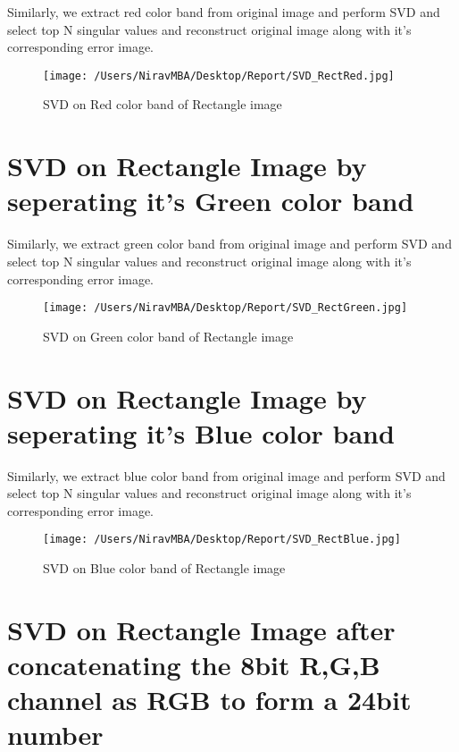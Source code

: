 \documentclass[12pt]{report}
\begin{document}
Similarly, we extract red color band from original image and perform SVD and select top N singular values and reconstruct original image along with it's corresponding error image.\\


\begin{figure}[H]
	
	\texttt{[image: /Users/NiravMBA/Desktop/Report/SVD\_RectRed.jpg]}
	\caption{SVD on Red color band of Rectangle image}
\end{figure}
\cleardoublepage

\section{SVD on Rectangle Image by seperating it's Green color band}

Similarly, we extract green color band from original image and perform SVD and select top N singular values and reconstruct original image along with it's corresponding error image.\\


\begin{figure}[H]
	
	\texttt{[image: /Users/NiravMBA/Desktop/Report/SVD\_RectGreen.jpg]}
	\caption{SVD on Green color band of Rectangle image}
\end{figure}
\cleardoublepage

\section{SVD on Rectangle Image by seperating it's Blue color band}

Similarly, we extract blue color band from original image and perform SVD and select top N singular values and reconstruct original image along with it's corresponding error image.\\


\begin{figure}[H]
	
	\texttt{[image: /Users/NiravMBA/Desktop/Report/SVD\_RectBlue.jpg]}
	\caption{SVD on Blue color band of Rectangle image}
\end{figure}

\cleardoublepage

\section{SVD on Rectangle Image after concatenating the 8bit R,G,B channel as RGB to form a 24bit number }
\end{document}
